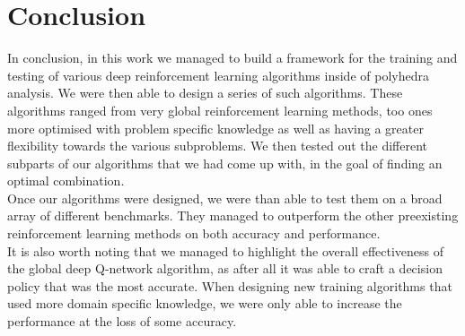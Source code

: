 
\chapter{Conclusion}

In conclusion, in this work we managed to build a framework for the training and testing of various deep reinforcement learning algorithms inside of polyhedra analysis. We were then able to design a series of such algorithms. These algorithms ranged from very global reinforcement learning methods, too ones more optimised with problem specific knowledge as well as having a greater flexibility towards the various subproblems. We then tested out the different subparts of our algorithms that we had come up with, in the goal of finding an optimal combination.\\
Once our algorithms were designed, we were than able to test them on a broad array of different benchmarks. They managed to outperform the other preexisting reinforcement learning methods on both accuracy and performance.\\
It is also worth noting that we managed to highlight the overall effectiveness of the global deep Q-network algorithm, as after all it was able to craft a decision policy that was the most accurate. When designing new training algorithms that used more domain specific knowledge, we were only able to increase the performance at the loss of some accuracy.